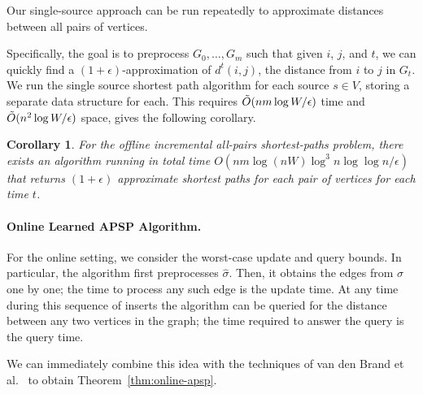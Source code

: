 \documentclass[11pt]{article}
\newtheorem{corollary}{Corollary}
\begin{document}
Our single-source  approach can be run repeatedly to approximate distances between all pairs of vertices.

Specifically, the goal is to preprocess $G_0, \ldots, G_m$ such that given $i$, $j$, and $t$, we can quickly find a $(1 + \epsilon)$-approximation of $d^t(i,j)$, the distance from $i$ to $j$ in $G_t$.  
We run the single source shortest path algorithm for each source $s\in V$, storing a separate data structure for each.  
This requires $\Tilde{O}(nm\log W/\epsilon)$ time and $\Tilde{O}(n^2 \log W / \epsilon)$ space, gives the following corollary.


\begin{corollary}
\label{cor:offline-approx-apsp}
    For the offline incremental all-pairs shortest-paths problem, there exists an algorithm running in total time $ O(nm\log(nW)\log^3 n \log\log n/\epsilon)$ that returns $(1+\epsilon)$ approximate shortest paths for each pair of vertices for each time $t$. 
\end{corollary}

\paragraph{Online Learned APSP Algorithm.}  
For the online setting, we consider the worst-case update and query bounds.  In particular, the algorithm first preprocesses $\hat{\sigma}$.  Then, it obtains the edges from $\sigma$ one by one; the time to process any such edge is the update time.  At any time during this sequence of inserts the algorithm can be queried for the distance between any two vertices in the graph; the time required to answer the query is the query time.

We can immediately combine this idea with the techniques of van den Brand et al.~\cite[Theorem 3.1]{BrandFNP24} to obtain Theorem~\ref{thm:online-apsp}.  
\end{document}
